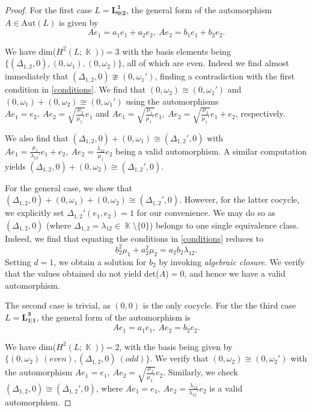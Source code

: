 \documentclass[12pt]{amsart}
\DeclareMathOperator{\K}{\mathbb{K}}
\begin{document}
\begin{proof}
For the first case $L=\mathbf{L^{1}_{0|2}}$, the general form of the automorphism $A\in \text{Aut}(L)$ is given by
\begin{equation*}
Ae_1=a_1e_1+a_2e_2, ~Ae_2=b_1e_1+b_2e_2.
\end{equation*}

We have dim($H^2(L;\K))=3$ with the basis elements being $\{(\Delta_{1,2},0),(0,\omega_1),(0,\omega_2)\}$, all of which are even. Indeed we find almost immediately that $(\Delta_{1,2},0)\ncong (0,\omega_1')$, finding a contradiction with the first condition in \eqref{conditions}. We find that $(0,\omega_2)\cong (0,\omega_1')$ and $(0,\omega_1)+(0,\omega_2) \cong (0,\omega_1')$ using the automorphisms $Ae_1=e_2, ~Ae_2=\sqrt{\frac{\mu_2}{\mu_1'}}e_1$ and $Ae_1=\sqrt{\frac{\mu_1}{\mu_1'}}e_1, ~Ae_2=\sqrt{\frac{\mu_2}{\mu_1'}}e_1+e_2$, respectively.

We also find that $(\Delta_{1,2},0)+(0,\omega_1)\cong ({\Delta}_{1,2}',0)$ with $Ae_1=\frac{\mu_1}{\lambda_{12}'}e_1+e_2, ~Ae_2=\frac{\lambda_{12}}{\mu_1}e_2$ being a valid automorphism. A similar computation yields $(\Delta_{1,2},0)+(0,\omega_2)\cong ({\Delta}_{1,2}',0)$.

For the general case, we show that $(\Delta_{1,2},0)+(0,\omega_1)+(0,\omega_2)\cong (\Delta_{1,2}',0)$. However, for the latter cocycle, we explicitly set $\Delta_{1,2}'(e_1,e_2)=1$ for our convenience. We may do so as $(\Delta_{1,2},0)$ (where $\Delta_{1,2}=\lambda_{12}\in \K\setminus\{0\}$) belongs to one single equivalence class. Indeed, we find that equating the conditions in \eqref{conditions} reduces to
\begin{equation*}
b_2^2\mu_1+a_2^2\mu_2=a_2b_2\lambda_{12}.
\end{equation*}
Setting $d=1$, we obtain a solution for $b_2$ by invoking \textit{algebraic closure}. We verify that the values obtained do not yield det($A$)$=0$, and hence we have a valid automorphism.

\vspace{0.5 em}

The second case is trivial, as $(0,0)$ is the only cocycle. For the the third case $L=\mathbf{L^3_{1|1}}$, the general form of the automorphism is
\begin{equation*}
Ae_1=a_1e_1, ~Ae_2=b_2e_2.
\end{equation*}

We have dim($H^2(L;\K)$)$=2$, with the basis being given by $\{(0,\omega_2) ~(even),(\Delta_{1,2},0) ~(odd)\}$. We verify that $(0,\omega_2) \cong (0,\omega_2')$ with the automorphism $Ae_1=e_1, ~Ae_2=\sqrt{\frac{\mu_2}{\mu_2'}}e_2$. Similarly, we check $(\Delta_{1,2},0)\cong (\Delta_{1,2}',0)$, where $Ae_1=e_1, ~Ae_2=\frac{\lambda_{12}}{\lambda_{12}'}e_2$ is a valid automorphism. 


\end{proof}
\end{document}
